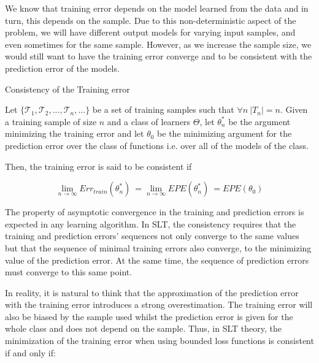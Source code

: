 We know that  training error depends on the model learned from the data and in turn, this depends on the sample. Due to this non-deterministic aspect of the problem, we will have different output  models for varying input samples, and even sometimes for the same sample. However, as we increase the sample size, we would still want to have the training error converge and to be consistent with the prediction error of the models.



\begin{definition}{Consistency of the Training error}

Let $\{\mathcal {T}_1, \mathcal {T}_2, ..., \mathcal {T}_n, ...  \}$ be a set of training samples such that $\forall n \ |T_n|=n$. Given a training sample of size $n$ and a class of learners $\Theta$, let $\theta^{*}_n$ be the argument minimizing the training error and let $\theta_0$ be the minimizing argument for the prediction error over the class of functions i.e. over all of the models of the class.

Then, the training error is said to be consistent if

\begin{equation}
\lim_{n\to\infty} Err_{train}(\theta^{*}_n) \  = \lim_{n\to\infty} EPE(\theta^{*}_n) \ =  EPE(\theta_0)
\end{equation}

\end{definition}

The property of asymptotic convergence in the training and prediction errors is expected in any learning algorithm. In SLT, the consistency requires that the training and prediction errors'  sequences not only converge to the same values but that the sequence of minimal training errors also converge, to the minimizing value of the prediction error. At the same time, the sequence of prediction errors must converge to this same point.

In reality, it is natural to think that the approximation of the prediction error with the training error introduces a strong overestimation. The training error will also be biased by the sample used whilst the prediction error is given for the whole class and does not depend on the sample. Thus, in SLT theory, the minimization of the training error when using bounded loss functions is consistent if and only if:


